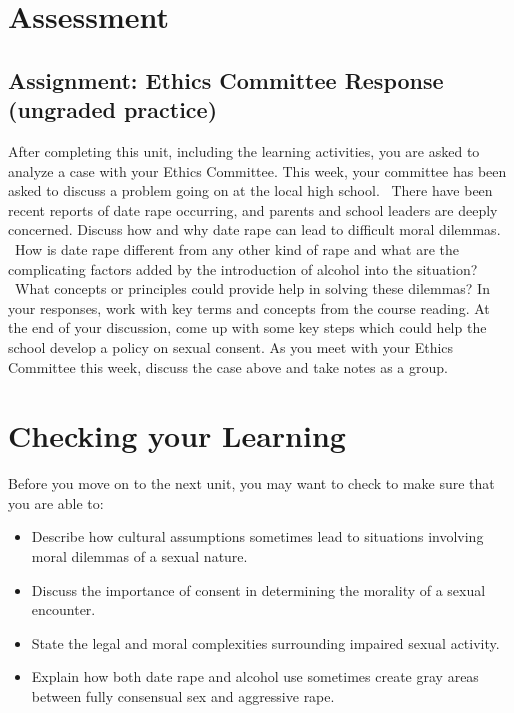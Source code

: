 \documentclass[
]{book}
\providecommand{\tightlist}{%
  \setlength{\itemsep}{0pt}\setlength{\parskip}{0pt}}
\begin{document}
\hypertarget{assessment-5}{%
\section*{Assessment}\label{assessment-5}}

\begin{assessment}
\hypertarget{assignment-ethics-committee-response-ungraded-practice-1}{%
\subsection*{Assignment: Ethics Committee Response (ungraded practice)}\label{assignment-ethics-committee-response-ungraded-practice-1}}

After completing this unit, including the learning activities, you are asked to analyze a case with your Ethics Committee.
This week, your committee has been asked to discuss a problem going on at the local high school. ~There have been recent reports of date rape occurring, and parents and school leaders are deeply concerned. Discuss how and why date rape can lead to difficult moral dilemmas. ~How is date rape different from any other kind of rape and what are the complicating factors added by the introduction of alcohol into the situation? ~What concepts or principles could provide help in solving these dilemmas? In your responses, work with key terms and concepts from the course reading. At the end of your discussion, come up with some key steps which could help the school develop a policy on sexual consent.
As you meet with your Ethics Committee this week, discuss the case above and take notes as a group.
\end{assessment}

\hypertarget{checking-your-learning-5}{%
\section*{Checking your Learning}\label{checking-your-learning-5}}

\begin{progress}
Before you move on to the next unit, you may want to check to make sure that you are able to:

\begin{itemize}
\tightlist
\item
  Describe how cultural assumptions sometimes lead to situations involving moral dilemmas of a sexual nature.\\
\item
  Discuss the importance of consent in determining the morality of a sexual encounter.\\
\item
  State the legal and moral complexities surrounding impaired sexual activity.\\
\item
  Explain how both date rape and alcohol use sometimes create gray areas between fully consensual sex and aggressive rape.
\end{itemize}
\end{progress}
\end{document}
